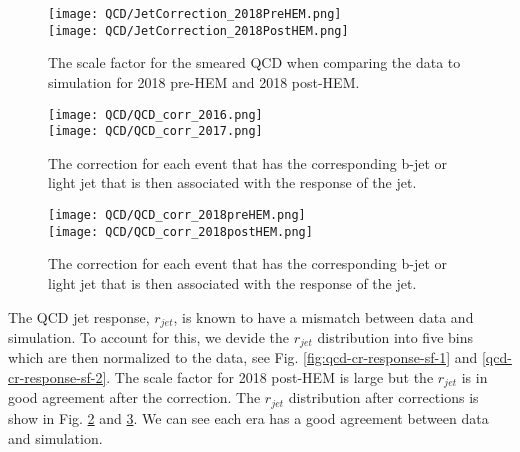 \begin{figure}
	\begin{center}
  \texttt{[image: QCD/JetCorrection\_2018PreHEM.png]} \\
  \texttt{[image: QCD/JetCorrection\_2018PostHEM.png]} \\
	\end{center}
	\caption[QCD Jet Response Scale Factor]{The scale factor for the smeared QCD when comparing the data to simulation for 2018 pre-HEM and 2018 post-HEM.}
	\label{fig:qcd-cr-response-sf-2}
\end{figure}

\begin{figure}
	\begin{center}
  \texttt{[image: QCD/QCD\_corr\_2016.png]} \\
  \texttt{[image: QCD/QCD\_corr\_2017.png]} \\
	\end{center}
	\caption[QCD Jet Response Correction]{The correction for each event that has the corresponding b-jet or light jet that is then associated with the response of the jet. }
	\label{fig:qcd-cr-response-corr-1}
\end{figure}

\begin{figure}
	\begin{center}
  \texttt{[image: QCD/QCD\_corr\_2018preHEM.png]} \\
  \texttt{[image: QCD/QCD\_corr\_2018postHEM.png]} \\
	\end{center}
	\caption[QCD Jet Response Correction]{The correction for each event that has the corresponding b-jet or light jet that is then associated with the response of the jet. }
	\label{fig:qcd-cr-response-corr-2}
\end{figure}

The QCD jet response, $r_{jet}$, is known to have a mismatch between data and simulation. To account for this, we devide the $r_{jet}$ distribution into five bins which are then normalized to the data, see Fig. \ref{fig:qcd-cr-response-sf-1} and \ref{qcd-cr-response-sf-2}. The scale factor for 2018 post-HEM is large but the $r_{jet}$ is in good agreement after the correction. The $r_{jet}$ distribution after corrections is show in Fig. \ref{fig:qcd-cr-response-corr-1} and \ref{fig:qcd-cr-response-corr-2}. We can see each era has a good agreement between data and simulation.

